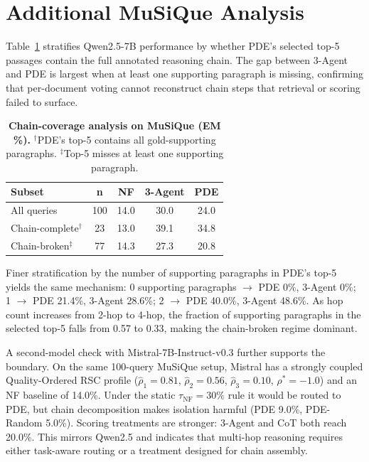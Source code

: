\documentclass[11pt]{article}
\theoremstyle{definition}
\begin{document}
\section{Additional MuSiQue Analysis}
\label{sec:appendix-musique}

Table~\ref{tab:musique-coverage} stratifies Qwen2.5-7B performance by whether PDE's selected top-5 passages contain the full annotated reasoning chain. The gap between 3-Agent and PDE is largest when at least one supporting paragraph is missing, confirming that per-document voting cannot reconstruct chain steps that retrieval or scoring failed to surface.

\begin{table}[ht]
\centering
\small
\setlength{\tabcolsep}{4pt}
\begin{tabular}{@{}lcccc@{}}
\toprule
\textbf{Subset} & \textbf{n} & \textbf{NF} & \textbf{3-Agent} & \textbf{PDE} \\
\midrule
All queries & 100 & 14.0 & 30.0 & 24.0 \\
Chain-complete\(^\dagger\) & 23 & 13.0 & 39.1 & 34.8 \\
Chain-broken\(^\ddagger\) & 77 & 14.3 & 27.3 & 20.8 \\
\bottomrule
\end{tabular}
\caption{\textbf{Chain-coverage analysis on MuSiQue (EM \%).} \(^\dagger\)PDE's top-5 contains all gold-supporting paragraphs. \(^\ddagger\)Top-5 misses at least one supporting paragraph.}
\label{tab:musique-coverage}
\end{table}

Finer stratification by the number of supporting paragraphs in PDE's top-5 yields the same mechanism: 0 supporting paragraphs \(\to\) PDE 0\%, 3-Agent 0\%; 1 \(\to\) PDE 21.4\%, 3-Agent 28.6\%; 2 \(\to\) PDE 40.0\%, 3-Agent 48.6\%. As hop count increases from 2-hop to 4-hop, the fraction of supporting paragraphs in the selected top-5 falls from 0.57 to 0.33, making the chain-broken regime dominant.

A second-model check with Mistral-7B-Instruct-v0.3 further supports the boundary. On the same 100-query MuSiQue setup, Mistral has a strongly coupled Quality-Ordered RSC profile (\(\hat{\rho}_1=0.81\), \(\hat{\rho}_2=0.56\), \(\hat{\rho}_3=0.10\), \(\rho^*=-1.0\)) and an NF baseline of 14.0\%. Under the static \(\tau_{\text{NF}}=30\%\) rule it would be routed to PDE, but chain decomposition makes isolation harmful (PDE 9.0\%, PDE-Random 5.0\%). Scoring treatments are stronger: 3-Agent and CoT both reach 20.0\%. This mirrors Qwen2.5 and indicates that multi-hop reasoning requires either task-aware routing or a treatment designed for chain assembly.
\end{document}
